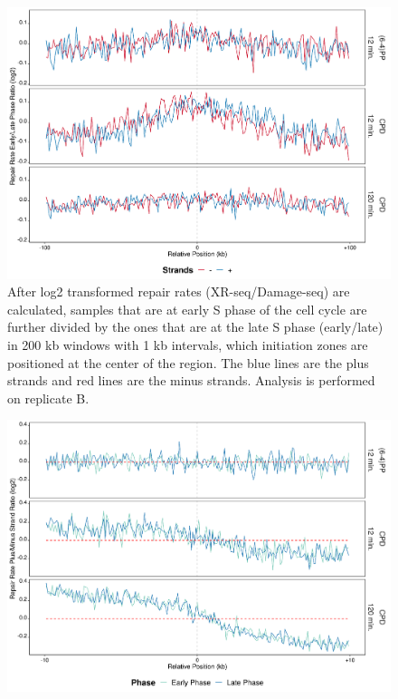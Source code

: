\begin{figure}[H]
\begin{center}
\includegraphics[width=\textwidth]{Chapters/7_appendix/figures/supfig41}
\caption[Repair rate early/late ratio of initiation zones in 200 kb (replicate B).]{After log2 transformed repair rates (XR-seq/Damage-seq) are calculated, samples that are at early S phase of the cell cycle are further divided by the ones that are at the late S phase (early/late) in 200 kb windows with 1 kb intervals, which initiation zones are positioned at the center of the region. The blue lines are the plus strands and red lines are the minus strands. Analysis is performed on replicate B.}
\label{supfig:rrel200inzonesB}
\end{center}
\end{figure}

\begin{figure}[H]
\begin{center}
\includegraphics[width=\textwidth]{Chapters/7_appendix/figures/supfig42}
\caption[]{}
\label{supfig:}
\end{center}
\end{figure}


